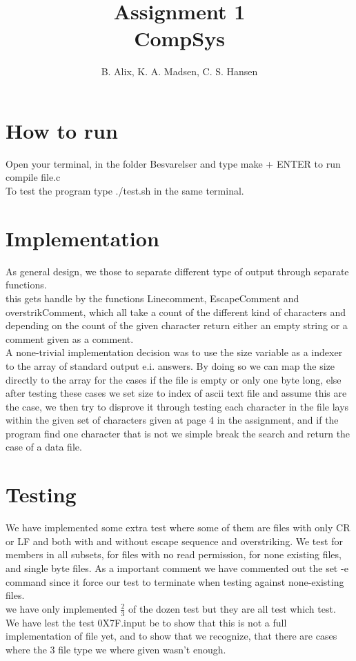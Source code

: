 \documentclass[12pt,a4paper]{article}
\author{B. Alix, K. A. Madsen, C. S. Hansen}
\title{Assignment 1 \\ CompSys}
\begin{document}
\clearpage\maketitle
\thispagestyle{empty}
\setcounter{page}{0}
\newpage

\section*{How to run}
Open your terminal, in the folder Besvarelser and type make + ENTER to run compile file.c
\\[10pt]
To test the program type ./test.sh in the same terminal.
\\[10pt]
\section*{Implementation}
As general design, we those to separate different type of output through separate functions. 
\\
this gets handle by the functions Linecomment, EscapeComment and overstrikComment, 
which all take a count of the different kind of characters and depending on the count of the given character return either an empty string or a comment given as a comment.
\\
A none-trivial implementation decision was to use the size variable as a indexer to the array of standard output e.i. answers. By doing so we can map the size directly to the array for the cases if the file is empty or only one byte long, else after testing these cases we set size to index of ascii text file and assume this are the case, we then try to disprove it through testing each character in the file lays within the given set of characters given at page 4 in the assignment, and if the program find one character that is not we simple break the search and return the case of a data file.

\section*{Testing}
We have implemented some extra test where some of them are files with only CR or LF and both with and without escape sequence and overstriking. We test for members in all subsets, for files with no read permission, for none existing files, and single byte files. As a important comment we have commented out the set -e command since it force our test to terminate when testing against none-existing files.
\\
we have only implemented $\frac{2}{3}$ of the dozen test but they are all test which test.
\\[10pt]
We have lest the test 0X7F.input be to show that this is not a full implementation of file yet, and to show that we recognize, that there are cases where the 3 file type we where given wasn't enough. 
\end{document}
